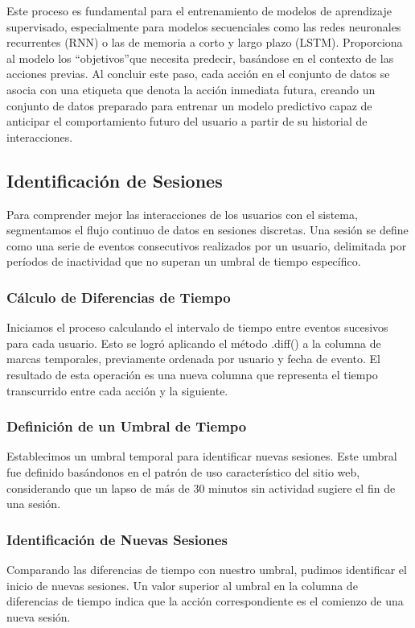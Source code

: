 Este proceso es fundamental para el entrenamiento de modelos de aprendizaje supervisado, especialmente para modelos secuenciales como las redes neuronales recurrentes (RNN) o las de memoria a corto y largo plazo (LSTM). Proporciona al modelo los \textquotedblleft objetivos\textquotedblright que necesita predecir, basándose en el contexto de las acciones previas. Al concluir este paso, cada acción en el conjunto de datos se asocia con una etiqueta que denota la acción inmediata futura, creando un conjunto de datos preparado para entrenar un modelo predictivo capaz de anticipar el comportamiento futuro del usuario a partir de su historial de interacciones.

\subsection{Identificación de Sesiones}

Para comprender mejor las interacciones de los usuarios con el sistema, segmentamos el flujo continuo de datos en sesiones discretas. Una sesión se define como una serie de eventos consecutivos realizados por un usuario, delimitada por períodos de inactividad que no superan un umbral de tiempo específico.

\subsubsection{Cálculo de Diferencias de Tiempo} 
Iniciamos el proceso calculando el intervalo de tiempo entre eventos sucesivos para cada usuario. Esto se logró aplicando el método .diff() a la columna de marcas temporales, previamente ordenada por usuario y fecha de evento. El resultado de esta operación es una nueva columna que representa el tiempo transcurrido entre cada acción y la siguiente.

\subsubsection{Definición de un Umbral de Tiempo} 
Establecimos un umbral temporal para identificar nuevas sesiones. Este umbral fue definido basándonos en el patrón de uso característico del sitio web, considerando que un lapso de más de 30 minutos sin actividad sugiere el fin de una sesión.

\subsubsection{Identificación de Nuevas Sesiones}
Comparando las diferencias de tiempo con nuestro umbral, pudimos identificar el inicio de nuevas sesiones. Un valor superior al umbral en la columna de diferencias de tiempo indica que la acción correspondiente es el comienzo de una nueva sesión.


